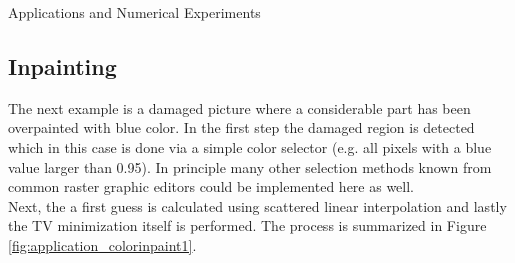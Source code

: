 \begin{chapter}{Applications and Numerical Experiments}
\FloatBarrier
\subsection{Inpainting} %
The next example is a damaged picture where a considerable part has been overpainted with blue color. In the first step the damaged region is detected which in this
case is done via a simple color selector (e.g. all pixels with a blue value larger than 0.95). In principle many other selection methods known from common raster graphic editors
could be implemented here as well. \\
Next, the a first guess is calculated using scattered linear interpolation and lastly the TV minimization itself is performed. The process is summarized in Figure 
\ref{fig:application_colorinpaint1}.


\end{chapter}
